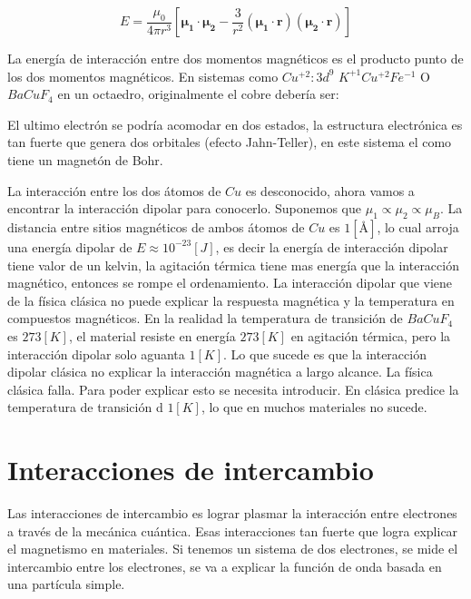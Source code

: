 \documentclass[11pt,fleqn]{book}
\renewcommand{\vec}[1]{\mathbf{#1}}
\begin{document}
\begin{equation}
    E=\frac{\mu_{0}}{4\pi r^{3}}\left[\vec{\mu_{1}}\cdot\vec{\mu_{2}}-\frac{3}{r^{2}}(\vec{\mu_{1}}\cdot\vec{r})(\vec{\mu_{2}}\cdot\vec{r})\right]
    \label{Eq. 5.1}
\end{equation}

La energía de interacción entre dos momentos magnéticos es el producto punto de los dos momentos magnéticos. En sistemas como $Cu^{+2}:3d^{9}$ $K^{+1}Cu^{+2}Fe^{-1}$ O $BaCuF_{4}$ en un octaedro, originalmente el cobre debería ser:


El ultimo electrón se podría acomodar en dos estados, la estructura electrónica es tan fuerte que genera dos orbitales (efecto Jahn-Teller), en este sistema el como tiene un magnetón de Bohr.


La interacción entre los dos átomos de $Cu$ es desconocido, ahora vamos a encontrar la interacción dipolar para conocerlo. Suponemos que $\mu_{1}\propto\mu_{2}\propto\mu_{B}$. La distancia entre sitios magnéticos de ambos átomos de $Cu$ es $1[\si{\angstrom}]$, lo cual arroja una energía dipolar de $E\approx10^{-23}[J]$, es decir la energía  de interacción dipolar tiene valor de un kelvin, la agitación térmica tiene mas energía  que la interacción magnético, entonces se rompe el ordenamiento. La interacción dipolar que viene de la física clásica no puede explicar la respuesta magnética y la temperatura en compuestos magnéticos.  En la realidad la temperatura de transición de $BaCuF_{4}$ es $273 [K]$, el material resiste en energía  $273 [K]$ en agitación térmica, pero la interacción dipolar solo aguanta $1 [K]$. Lo que sucede es que la interacción dipolar clásica no explicar la interacción magnética a largo alcance. La física clásica falla. Para poder explicar esto se necesita introducir. En clásica predice la temperatura de transición d $1 [K]$, lo que en muchos materiales no sucede.

\section{Interacciones de intercambio} 

Las interacciones de intercambio es lograr plasmar la interacción entre electrones a través de la mecánica cuántica. Esas interacciones tan fuerte que logra explicar el magnetismo en materiales. Si tenemos un sistema de dos electrones, se mide el intercambio entre los electrones, se va a explicar la función de onda basada en una partícula simple.
\end{document}
